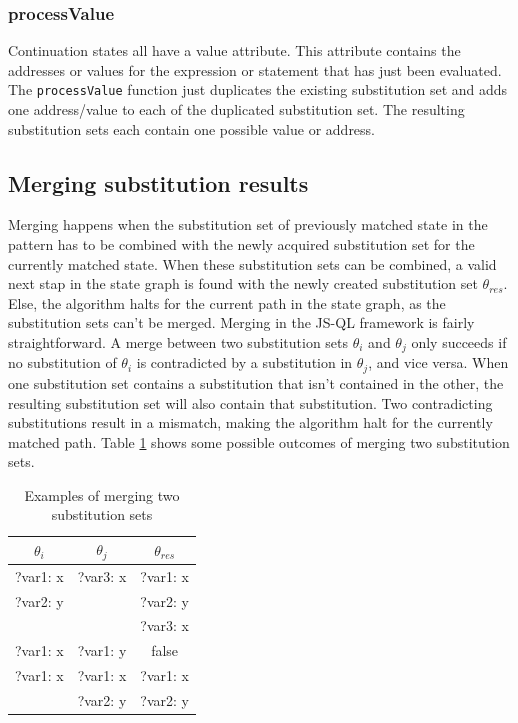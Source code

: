 \subsubsection{processValue}
Continuation states all have a value attribute. This attribute contains the addresses or values for the expression or statement that has just been evaluated. The \texttt{processValue} function just duplicates the existing substitution set and adds one address/value to each of the duplicated substitution set. The resulting substitution sets each contain one possible value or address.



\subsection{Merging substitution results}
\label{subsec:merging}

Merging happens when the substitution set of previously matched state in the pattern has to be combined with the newly acquired substitution set for the currently matched state. When these substitution sets can be combined, a valid next stap in the state graph is found with the newly created substitution set $\theta_{res}$. Else, the algorithm halts for the current path in the state graph, as the substitution sets can't be merged. Merging in the JS-QL framework is fairly straightforward. A merge between two substitution sets $\theta_i$ and $\theta_j$ only succeeds if no substitution of $\theta_i$ is contradicted by a substitution in $\theta_j$, and vice versa. When one substitution set contains a substitution that isn't contained in the other, the resulting substitution set will also contain that substitution. Two contradicting substitutions result in a mismatch, making the algorithm halt for the currently matched path. Table \ref{tab:merging} shows some possible outcomes of merging two substitution sets.

\begin{table}[!h]
\centering
  \begin{tabular}{| c | c | c |}
  \hline
  $\theta_i$ & $\theta_j$ & $\theta_{res}$\\
  \hline \hline
  ?var1: x & ?var3: x & ?var1: x\\
  ?var2: y &  & ?var2: y\\
  &  & ?var3: x\\
  \hline
  ?var1: x & ?var1: y & false\\
  \hline
  ?var1: x & ?var1: x & ?var1: x\\
  & ?var2: y & ?var2: y \\
  \hline

  \end{tabular}
  
  \caption{Examples of merging two substitution sets}
  \label{tab:merging}
\end{table}

